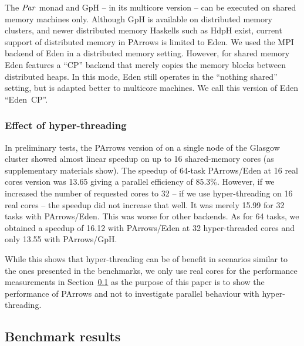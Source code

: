 The \ensuremath{\Conid{Par}} monad and GpH -- in its multicore version \cite{Marlow2009} --  can be executed on shared memory machines only.
Although GpH is available on distributed memory
clusters, and newer distributed memory Haskells such as HdpH exist,
current support of distributed memory in PArrows is limited to
Eden. We used the MPI backend of Eden in a distributed memory
setting. However, for shared memory Eden features a \enquote{CP} backend
that merely copies the memory blocks between distributed heaps. In
this mode, Eden still operates in the \enquote{nothing shared} setting, but
is adapted better to multicore machines. We call this version of Eden
\enquote{Eden~CP}.



\subsubsection{Effect of hyper-threading}

In preliminary tests, the PArrows version of \rmtest on a single node of the Glasgow cluster
showed almost linear speedup on up to 16 shared-memory cores (as supplementary materials show). The speedup
of 64-task PArrows/Eden at 16 real cores version was 13.65 giving a parallel
efficiency of 85.3\%. However, if we increased the number of
requested cores to 32 -- \ie if we use hyper-threading on 16 real
cores -- the speedup did not increase that well. It was merely 15.99
for 32 tasks with PArrows/Eden. This was worse for other backends.  As
for 64 tasks, we obtained a speedup of 16.12 with PArrows/Eden at 32
hyper-threaded cores and only 13.55 with PArrows/GpH. 

While this shows that hyper-threading can be of benefit in scenarios similar to the ones presented in the benchmarks, we only use real cores for the performance measurements in Section~\ref{sec:benchmarkResults} as the purpose of this paper is to show the performance of PArrows and not to investigate parallel behaviour with hyper-threading.




\subsection{Benchmark results}\label{sec:benchmarkResults}

